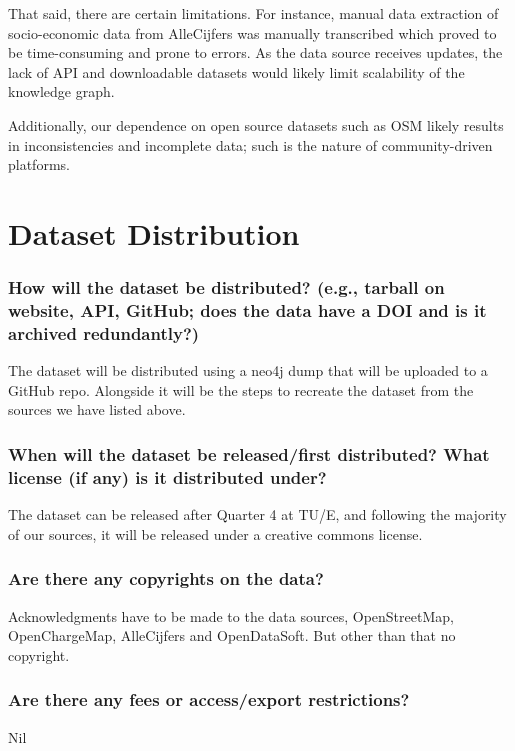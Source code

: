 \documentclass{article}
\newcommand{\question}[1]{#1}
\begin{document}
That said, there are certain limitations. For instance, manual data extraction of socio-economic data from AlleCijfers was manually transcribed which proved to be time-consuming and prone to errors. As the data source receives updates, the lack of API and downloadable datasets would likely limit scalability of the knowledge graph.

Additionally, our dependence on open source datasets such as OSM likely results in inconsistencies and incomplete data; such is the nature of community-driven platforms.


\section{Dataset Distribution}

\question{\subsubsection*{How will the dataset be distributed? (e.g., tarball on
		website, API, GitHub; does the data have a DOI and is it
		archived redundantly?)}}
The dataset will be distributed using a neo4j dump that will be uploaded to a GitHub repo. Alongside it will be the steps to recreate the dataset from the sources we have listed above.

\question{\subsubsection*{When will the dataset be released/first distributed?
		What license (if any) is it distributed under?}}
The dataset can be released after Quarter 4 at TU/E, and following the majority of our sources, it will be released under a creative commons license.

\question{\subsubsection*{Are there any copyrights on the data?}}
Acknowledgments have to be made to the data sources, OpenStreetMap, OpenChargeMap, AlleCijfers and OpenDataSoft. But other than that no copyright.

\question{\subsubsection*{Are there any fees or access/export restrictions?}}
Nil
\end{document}
